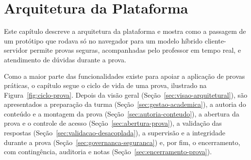 \chapter{Arquitetura da Plataforma}
\label{cap:arquitetura}

Este capítulo descreve a arquitetura da plataforma e mostra como a passagem de um protótipo que rodava só no navegador para um modelo híbrido cliente-servidor permite provas seguras, acompanhadas pelo professor em tempo real, e atendimento de dúvidas durante a prova.

Como a maior parte das funcionalidades existe para apoiar a aplicação de provas práticas, o capítulo segue o ciclo de vida de uma prova, ilustrado na Figura~\ref{fig:ciclo-prova}. Depois da visão geral (Seção~\ref{sec:visao-arquitetural}), são apresentados a preparação da turma (Seção~\ref{sec:gestao-academica}), a autoria do conteúdo e a montagem da prova (Seção~\ref{sec:autoria-conteudo}), a abertura da prova e o controle de acesso (Seção~\ref{sec:abertura-prova}), a validação das respostas (Seção~\ref{sec:validacao-desacoplada}), a supervisão e a integridade durante a prova (Seção~\ref{sec:governanca-seguranca}) e, por fim, o encerramento, com contingência, auditoria e notas (Seção~\ref{sec:encerramento-prova}).

